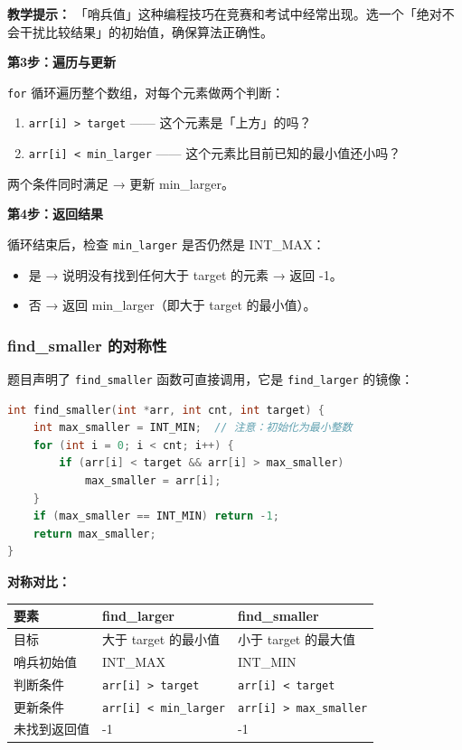 \textbf{教学提示：} 「哨兵值」这种编程技巧在竞赛和考试中经常出现。选一个「绝对不会干扰比较结果」的初始值，确保算法正确性。

\vspace{0.4em}
\textbf{第3步：遍历与更新}

\texttt{for} 循环遍历整个数组，对每个元素做两个判断：
\begin{enumerate}
    \item \texttt{arr[i] > target} —— 这个元素是「上方」的吗？
    \item \texttt{arr[i] < min\_larger} —— 这个元素比目前已知的最小值还小吗？
\end{enumerate}
两个条件同时满足 → 更新 min\_larger。

\vspace{0.4em}
\textbf{第4步：返回结果}

循环结束后，检查 \texttt{min\_larger} 是否仍然是 INT\_MAX：
\begin{itemize}
    \item 是 → 说明没有找到任何大于 target 的元素 → 返回 -1。
    \item 否 → 返回 min\_larger（即大于 target 的最小值）。
\end{itemize}

\subsubsection{find\_smaller 的对称性}

题目声明了 \texttt{find\_smaller} 函数可直接调用，它是 \texttt{find\_larger} 的镜像：

\begin{lstlisting}[language=C]
int find_smaller(int *arr, int cnt, int target) {
    int max_smaller = INT_MIN;  // 注意：初始化为最小整数
    for (int i = 0; i < cnt; i++) {
        if (arr[i] < target && arr[i] > max_smaller)
            max_smaller = arr[i];
    }
    if (max_smaller == INT_MIN) return -1;
    return max_smaller;
}
\end{lstlisting}

\textbf{对称对比：}
\begin{table}[h]
    \centering
    \begin{tabular}{@{}lll@{}}
        \toprule
        \textbf{要素}                 & \textbf{find\_larger} & \textbf{find\_smaller} \\
        \midrule
        目标                  & 大于 target 的最小值        & 小于 target 的最大值           \\
        哨兵初始值               & INT\_MAX                  & INT\_MIN                   \\
        判断条件                & \texttt{arr[i] > target} & \texttt{arr[i] < target}  \\
        更新条件                & \texttt{arr[i] < min\_larger} & \texttt{arr[i] > max\_smaller} \\
        未找到返回值              & -1                       & -1                         \\
        \bottomrule
    \end{tabular}
\end{table}


